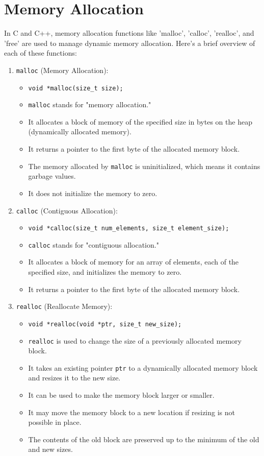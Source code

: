 \documentclass{article}
\begin{document}
\section{Memory Allocation}
In C and C++, memory allocation functions like 'malloc', 'calloc', 'realloc', and 'free' are used to manage dynamic memory allocation. Here's a brief overview of each of these functions:
\begin{enumerate}
  \item \texttt{malloc} (Memory Allocation):
    \begin{itemize}
      \item \texttt{void *malloc(size\_t size);}
      \item \texttt{malloc} stands for "memory allocation."
      \item It allocates a block of memory of the specified size in bytes on the heap (dynamically allocated memory).
      \item It returns a pointer to the first byte of the allocated memory block.
      \item The memory allocated by \texttt{malloc} is uninitialized, which means it contains garbage values.
      \item It does not initialize the memory to zero.
    \end{itemize}

  \item \texttt{calloc} (Contiguous Allocation):
    \begin{itemize}
      \item \texttt{void *calloc(size\_t num\_elements, size\_t element\_size);}
      \item \texttt{calloc} stands for "contiguous allocation."
      \item It allocates a block of memory for an array of elements, each of the specified size, and initializes the memory to zero.
      \item It returns a pointer to the first byte of the allocated memory block.
    \end{itemize}

  \item \texttt{realloc} (Reallocate Memory):
    \begin{itemize}
      \item \texttt{void *realloc(void *ptr, size\_t new\_size);}
      \item \texttt{realloc} is used to change the size of a previously allocated memory block.
      \item It takes an existing pointer \texttt{ptr} to a dynamically allocated memory block and resizes it to the new size.
      \item It can be used to make the memory block larger or smaller.
      \item It may move the memory block to a new location if resizing is not possible in place.
      \item The contents of the old block are preserved up to the minimum of the old and new sizes.
    \end{itemize}


\end{enumerate}
\end{document}
